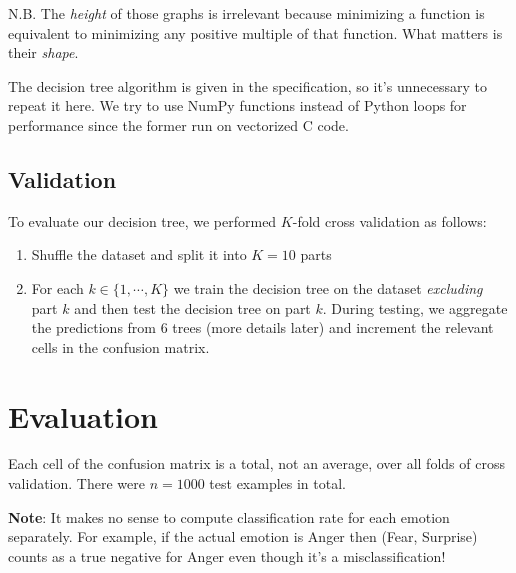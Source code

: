 \documentclass[12pt, a4paper]{article}
\begin{document}
N.B. The \textit{height} of those graphs is irrelevant because minimizing a function is equivalent to minimizing any positive multiple of that function. What matters is their \textit{shape}.\par
\bigskip
The decision tree algorithm is given in the specification, so it's unnecessary to repeat it here. We try to use NumPy functions instead of Python loops for performance since the former run on vectorized C code.\par
\subsection*{Validation}
To evaluate our decision tree, we performed $K$-fold cross validation as follows:
\begin{enumerate}
    \item Shuffle the dataset and split it into $K = 10$ parts
    \item For each $k \in \{1, \dotsm, K\}$ we train the decision tree on the dataset \textit{excluding} part $k$ and then test the decision tree on part $k$. During testing, we aggregate the predictions from 6 trees (more details later) and increment the relevant cells in the confusion matrix.
\end{enumerate}

\section*{Evaluation}
Each cell of the confusion matrix is a total, not an average, over all folds of cross validation. There were $n = 1000$ test examples in total.\par
\bigskip
\textbf{Note}: It makes no sense to compute classification rate for each emotion separately. For example, if the actual emotion is Anger then (Fear, Surprise) counts as a true negative for Anger even though it's a misclassification!
\bigskip
\end{document}
